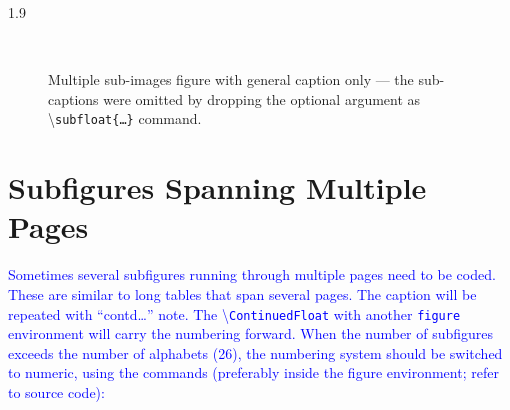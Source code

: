\documentclass[phd]{ndsu-thesis-2022}
\newcommand\myspacing{1.9} %
\newcommand\italk[1]{\textcolor{blue}{#1}}  %
\newcommand\cmd[1]{\textbackslash\texttt{#1}}  %
\begin{document}
\begin{spacing}{\myspacing}
\begin{figure}[H]
\hspace{0.25in}
\hspace{0.25in}
\hspace{0.25in}
\hspace{0.25in}
\hspace{0.25in}\\

\captionsetup{singlelinecheck=false} %
\caption{Multiple sub-images figure with general caption only  --- the sub-captions were omitted by dropping the optional argument as \cmd{subfloat\{\ldots\}} command.} \label{fig6a}
\end{figure}


\section{Subfigures Spanning Multiple Pages}
\italk{Sometimes several subfigures running through multiple pages need to be coded. These are similar to long tables that span several pages. The caption will be repeated with ``contd\ldots'' note. The \cmd{ContinuedFloat} with another \texttt{figure} environment will carry the numbering forward. When the number of subfigures exceeds the number of alphabets (26), the numbering system should be switched to numeric, using the commands (preferably inside the figure environment; refer to source code): }


\end{spacing}
\end{document}
